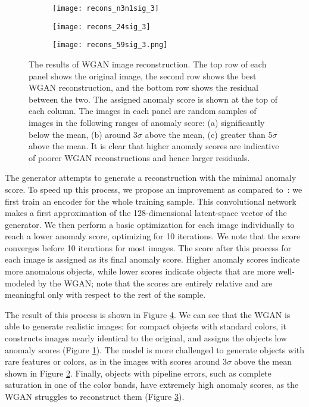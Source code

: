 \documentclass{article}
\begin{document}
\begin{figure}[ht!]
\begin{subfigure}{.325\textwidth}
  \centering
  \texttt{[image: recons\_n3n1sig\_3]}  
  \caption{}
  \label{fig:recon_neg}
\end{subfigure}
\hfill
\begin{subfigure}{.325\textwidth}
  \centering
  \texttt{[image: recons\_24sig\_3]}  
  \caption{}
  \label{fig:recon_3sig}
\end{subfigure}
\hfill
\begin{subfigure}{.325\textwidth}
  \centering
  \texttt{[image: recons\_59sig\_3.png]}
  \caption{}
  \label{fig:recon_5sig}
\end{subfigure}
\caption{The results of WGAN image reconstruction. The top row of each panel shows the original image, the second row shows the best WGAN reconstruction, and the bottom row shows the residual between the two. The assigned anomaly score is shown at the top of each column. The images in each panel are random samples of images in the following ranges of anomaly score: (a) significantly below the mean, (b) around $3\sigma$ above the mean, (c) greater than $5\sigma$ above the mean. It is clear that higher anomaly scores are indicative of poorer WGAN reconstructions and hence larger residuals.}
\label{fig:recon}
\end{figure}

The generator attempts to generate a reconstruction with the minimal anomaly score. 
To speed up this process, we propose an improvement as compared to~\cite{Schlegl2017}: we first train an encoder for the whole training sample.
This convolutional network makes a first approximation of the 128-dimensional latent-space vector of the generator.
We then perform a basic optimization for each image individually to reach a lower anomaly score, optimizing for 10 iterations.
We note that the score converges before 10 iterations for most images.
The score after this process for each image is assigned as its final anomaly score.
Higher anomaly scores indicate more anomalous objects, while lower scores indicate objects that are more well-modeled by the WGAN; note that the scores are entirely relative and are meaningful only with respect to the rest of the sample.

The result of this process is shown in Figure \ref{fig:recon}.
We can see that the WGAN is able to generate realistic images; for compact objects with standard colors, it constructs images nearly identical to the original, and assigns the objects low anomaly scores (Figure \ref{fig:recon_neg}).
The model is more challenged to generate objects with rare features or colors, as in the images with scores around $3\sigma$ above the mean shown in Figure \ref{fig:recon_3sig}.
Finally, objects with pipeline errors, such as complete saturation in one of the color bands, have extremely high anomaly scores, as the WGAN struggles to reconstruct them (Figure \ref{fig:recon_5sig}).
\end{document}
